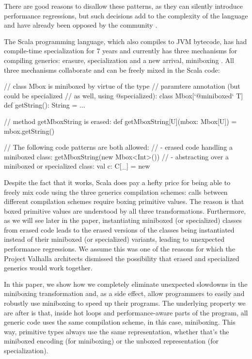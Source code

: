 There are good reasons to disallow these patterns, as they can silently introduce performance regressions, but such decisions add to the complexity of the language and have already been opposed by the community \cite{king-valhalla-email}.

The Scala programming language, which also compiles to JVM bytecode, has had compile-time specialization for 7 years \cite{iuli-thesis, specialization-iuli} and currently has three mechanisms for compiling generics: erasure, specialization and a new arrival, miniboxing \cite{miniboxing}. All three mechanisms collaborate and can be freely mixed in the Scala code:

\begin{lstlisting-nobreak}
// class Mbox is miniboxed by virtue of the type
// paramtere annotation (but could be specialized
// as well, using @specialized):
class Mbox[`@miniboxed` T] {
  def getString(): String = ...
}

// method getMboxString is erased:
def getMboxString[U](mbox: Mbox[U]) = mbox.getString()

// The following code patterns are both allowed:
//  - erased code handling a miniboxed class:
getMboxString(new Mbox<Int>())
//  - abstracting over a miniboxed or specialized class:
val c: C[_] = new
\end{lstlisting-nobreak}

Despite the fact that it works, Scala does pay a hefty price for being able to freely mix code using the three generics compilation schemes: calls between different compilation schemes require boxing primitive values. The reason is that boxed primitive values are understood by all three transformations. Furthermore, as we will see later in the paper, instantiating miniboxed (or specialized) classes from erased code leads to the erased versions of the classes being instantiated instead of their miniboxed (or specialized) variants, leading to unexpected performance regressions. We assume this was one of the reasons for which the Project Valhalla architects dismissed the possibility that erased and specialized generics would work together.

In this paper, we show how we completely eliminate unexpected slowdowns in the miniboxing transformation and, as a side effect, allow programmers to easily and robustly use miniboxing to speed up their programs. The underlying property we are after is that, inside hot loops and performance-aware parts of the program, all generic code uses the same compilation scheme, in this case, miniboxing. This way, primitive types always use the same representation, whether that's the miniboxed encoding (for miniboxing) or the unboxed representation (for specialization).

